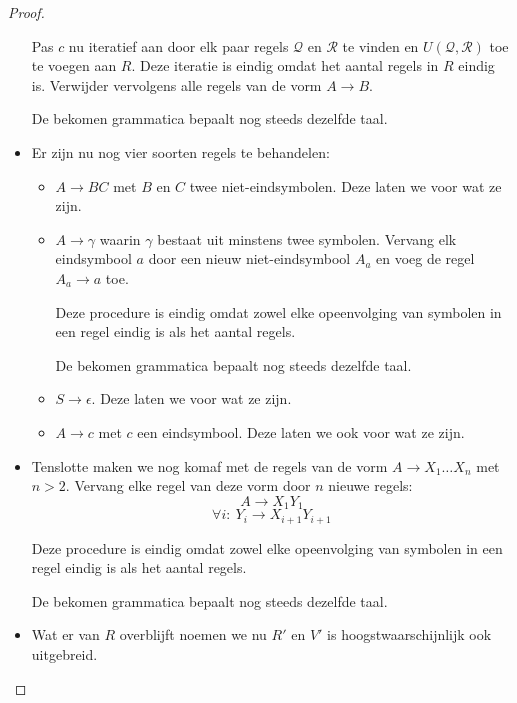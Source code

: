 \documentclass[main.tex]{subfiles}
\begin{document}
\begin{st}
\begin{proof}
\begin{itemize}
      Pas $c$ nu iteratief aan door elk paar regels $\mathcal{Q}$ en $\mathcal{R}$ te vinden en $U(\mathcal{Q},\mathcal{R})$ toe te voegen aan $R$.
      Deze iteratie is eindig omdat het aantal regels in $R$ eindig is.
      Verwijder vervolgens alle regels van de vorm $A\rightarrow B$.

      De bekomen grammatica bepaalt nog steeds dezelfde taal.

    \item Er zijn nu nog vier soorten regels te behandelen:
      \begin{itemize}
      \item $A\rightarrow BC$ met $B$ en $C$ twee niet-eindsymbolen.
        Deze laten we voor wat ze zijn.
      \item $A\rightarrow \gamma$ waarin $\gamma$ bestaat uit minstens twee symbolen.
        Vervang elk eindsymbool $a$ door een nieuw niet-eindsymbool $A_{a}$ en voeg de regel $A_{a} \rightarrow a$ toe.

        Deze procedure is eindig omdat zowel elke opeenvolging van symbolen in een regel eindig is als het aantal regels.

        De bekomen grammatica bepaalt nog steeds dezelfde taal.

      \item $S\rightarrow \epsilon$.
        Deze laten we voor wat ze zijn.
      \item $A\rightarrow c$ met $c$ een eindsymbool.
        Deze laten we ook voor wat ze zijn.
      \end{itemize}
    
    \item Tenslotte maken we nog komaf met de regels van de vorm $A \rightarrow X_{1}\dotsc X_{n}$ met $n > 2$.
      Vervang elke regel van deze vorm door $n$ nieuwe regels:
      \[ A \rightarrow X_{1}Y_{1} \]
      \[ \forall i:\ Y_{i} \rightarrow X_{i+1}Y_{i+1} \]

      Deze procedure is eindig omdat zowel elke opeenvolging van symbolen in een regel eindig is als het aantal regels.

      De bekomen grammatica bepaalt nog steeds dezelfde taal.


    \item Wat er van $R$ overblijft noemen we nu $R'$ en $V'$ is hoogstwaarschijnlijk ook uitgebreid.
    \end{itemize}
  \end{proof}
\end{st}
\end{document}
